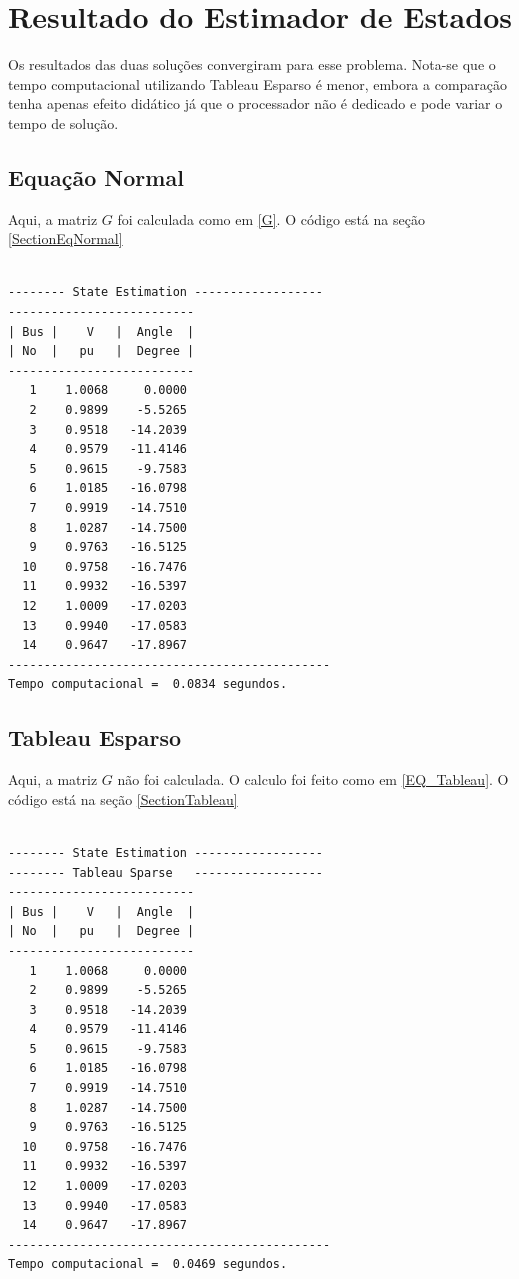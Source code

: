 \section{Resultado do Estimador de Estados}
\label{SectionResultados}
Os resultados das duas soluções convergiram para esse problema. Nota-se que o tempo computacional utilizando Tableau Esparso é menor, embora a comparação tenha apenas efeito didático já que o processador não é dedicado e pode variar o tempo de solução.

\subsection{Equação Normal}
Aqui, a matriz $G$ foi calculada como em \ref{G}. O código está na seção \ref{SectionEqNormal}
\begin{verbatim}
    
-------- State Estimation ------------------
--------------------------
| Bus |    V   |  Angle  | 
| No  |   pu   |  Degree | 
--------------------------
   1    1.0068     0.0000
   2    0.9899    -5.5265
   3    0.9518   -14.2039
   4    0.9579   -11.4146
   5    0.9615    -9.7583
   6    1.0185   -16.0798
   7    0.9919   -14.7510
   8    1.0287   -14.7500
   9    0.9763   -16.5125
  10    0.9758   -16.7476
  11    0.9932   -16.5397
  12    1.0009   -17.0203
  13    0.9940   -17.0583
  14    0.9647   -17.8967
---------------------------------------------
Tempo computacional =  0.0834 segundos.
\end{verbatim}
\subsection{Tableau Esparso}
Aqui, a matriz $G$ não foi calculada. O calculo foi feito como em \ref{EQ_Tableau}. O código está na seção \ref{SectionTableau}
\begin{verbatim}
    
-------- State Estimation ------------------
-------- Tableau Sparse   ------------------
--------------------------
| Bus |    V   |  Angle  | 
| No  |   pu   |  Degree | 
--------------------------
   1    1.0068     0.0000
   2    0.9899    -5.5265
   3    0.9518   -14.2039
   4    0.9579   -11.4146
   5    0.9615    -9.7583
   6    1.0185   -16.0798
   7    0.9919   -14.7510
   8    1.0287   -14.7500
   9    0.9763   -16.5125
  10    0.9758   -16.7476
  11    0.9932   -16.5397
  12    1.0009   -17.0203
  13    0.9940   -17.0583
  14    0.9647   -17.8967
---------------------------------------------
Tempo computacional =  0.0469 segundos.
\end{verbatim}